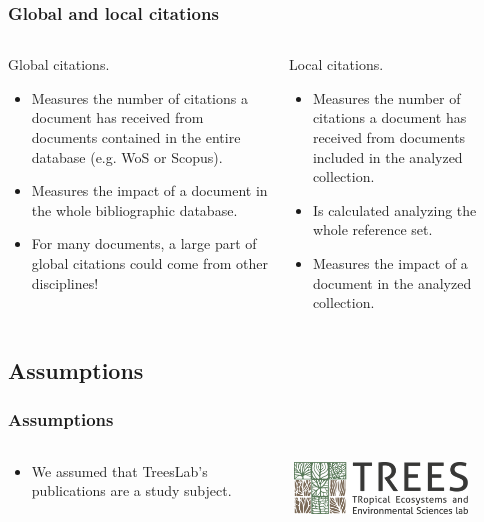 \documentclass[aspectratio=169]{beamer}
\begin{document}
\begin{frame}
	\frametitle{Global and local citations}
	\begin{columns}
		\begin{column}{0.5\textwidth}
			Global citations.
			\begin{itemize}
				\item Measures the number of citations a document has received 
                    from documents contained in the entire database (e.g. WoS 
                    or Scopus).
				\item Measures the impact of a document in the whole 
                    bibliographic database.
				\item For many documents, a large part of global citations 
                    could come from other disciplines!
			\end{itemize}
		\end{column}
		\begin{column}{0.5\textwidth}
			Local citations.
			\begin{itemize}
				\item Measures the number of citations a document has received 
                    from documents included in the analyzed collection.
				\item Is calculated analyzing the whole reference set.
				\item Measures the impact of a document in the analyzed 
                    collection.
			\end{itemize}
		\end{column}
	\end{columns}
\end{frame}

\subsection{Assumptions}

\begin{frame}
	\frametitle{Assumptions}
	\begin{columns}
		\begin{column}{0.5\textwidth}
        \begin{itemize}
            \item We assumed that TreesLab's publications are a study subject.
        \end{itemize}
        \end{column}
		\begin{column}{0.5\textwidth}
            \includegraphics[width=0.8\textwidth]{logos/trees-color-h_2.png}
        \end{column}
	\end{columns}
\end{frame}
\end{document}
